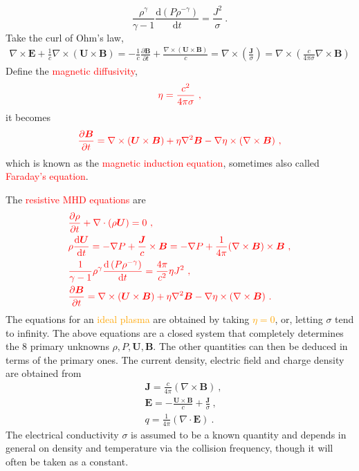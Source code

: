 \documentclass[12pt,a4paper]{article}
\renewcommand{\vec}[1]{\boldsymbol{#1}}
\newcommand{\dif}{\mathrm{d}}
\begin{document}
\begin{equation}
\frac{\rho^\gamma}{\gamma-1} \frac{\dif \left(P \rho^{-\gamma}\right) }{\dif t} = \frac{J^2}{\sigma} ~.
\end{equation}
Take the curl of Ohm's law, 
\begin{eqnarray*}
\nabla \times \vec{E} +\frac{1}{c}\nabla \times (\vec{U}\times \vec{B}) = -\frac{1}{c}\frac{\partial \vec{B}}{\partial t} + \frac{\nabla \times (\vec{U}\times \vec{B})}{c} = \nabla \times \left(\frac{\vec{J}}{\sigma} \right) = \nabla \times \left(\frac{c}{4\pi\sigma} \nabla \times \vec{B}\right) 
\end{eqnarray*}
Define the \textcolor{red}{magnetic diffusivity},
\begin{equation}
\color{red} \eta = \frac{c^2}{4\pi \sigma} ~,
\end{equation}
it becomes
\begin{equation}
\color{red} \frac{\partial \vec{B}}{\partial t} = \nabla \times (\vec{U}\times \vec{B}) +\eta \nabla^2 \vec{B} -\nabla \eta \times (\nabla \times \vec{B}) ~,
\end{equation}
which is known as the \textcolor{red}{magnetic induction equation}, sometimes also called  \textcolor{red}{Faraday’s equation}.

The \textcolor{red}{resistive MHD equations} are
\begin{align}
& \color{red} \frac{\partial \rho}{\partial t} + \nabla \cdot (\rho \vec{U}) = 0 ~, \\
& \color{red} \rho \frac{\dif \vec{U}}{\dif t} = -\nabla P + \frac{\vec{J}}{c} \times \vec{B} = -\nabla P +\frac{1}{4\pi} (\nabla \times \vec{B}) \times \vec{B} ~, \\
& \color{red} \frac{1}{\gamma-1} \rho^\gamma \frac{\dif \left(P \rho^{-\gamma} \right) }{\dif t} = \frac{4\pi}{c^2} \eta J^2 ~, \\
& \color{red} \frac{\partial \vec{B}}{\partial t} = \nabla \times (\vec{U} \times \vec{B}) + \eta \nabla^2 \vec{B} -\nabla \eta \times (\nabla \times \vec{B}) ~.
\end{align}
The equations for an \textcolor{orange}{ideal plasma} are obtained by taking \textcolor{orange}{$\eta = 0$}, or, letting $\sigma$ tend to infinity. The above equations are a closed system that completely determines the $8$ primary unknowns $\rho, P, \vec{U}, \vec{B}$. The other quantities can then be deduced in terms of the primary ones. The current density, electric field and charge density are obtained from
\begin{align*}
& \vec{J} = \frac{c}{4\pi} (\nabla \times \vec{B}) ~, \\
& \vec{E} = -\frac{\vec{U}\times \vec{B}}{c} + \frac{\vec{J}}{\sigma} ~, \\
& q = \frac{1}{4\pi} (\nabla \cdot \vec{E}) ~.
\end{align*}
The electrical conductivity $\sigma$ is assumed to be a known quantity and depends in general on density and temperature via the collision frequency, though it will often be taken as a constant.
\end{document}
